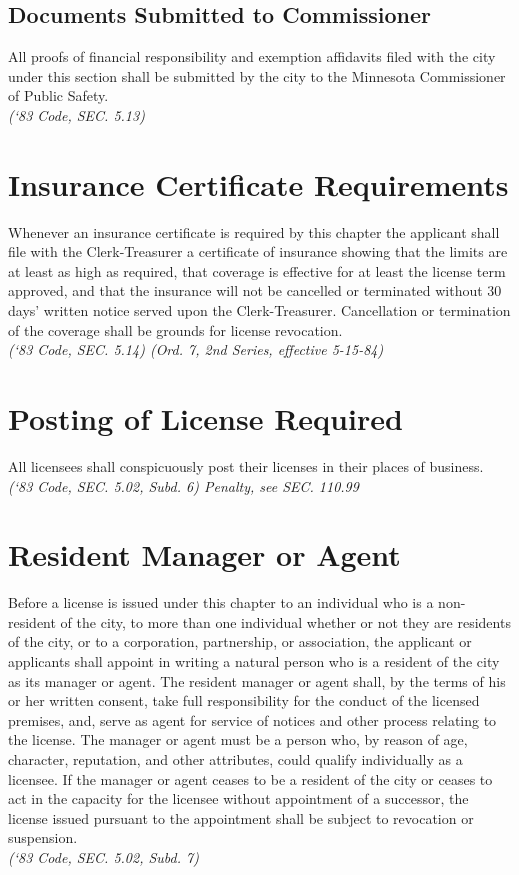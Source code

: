 \subsection{Documents Submitted to Commissioner}
All proofs of financial responsibility and exemption affidavits filed with the city under this section shall be submitted by the city to the Minnesota Commissioner of Public Safety.\\
\emph{(‘83 Code, SEC. 5.13)}
\section{Insurance Certificate Requirements}
Whenever an insurance certificate is required by this chapter the applicant shall file with the Clerk-Treasurer a certificate of insurance showing that the limits are at least as high as required, that coverage is effective for at least the license term approved, and that the insurance will not be cancelled or terminated without 30 days’ written notice served upon the Clerk-Treasurer.  Cancellation or termination of the coverage shall be grounds for license revocation.\\
\emph{(‘83 Code, SEC. 5.14)  (Ord. 7, 2nd Series, effective 5-15-84)}
\section{Posting of License Required}
All licensees shall conspicuously post their licenses in their places of business.\\
\emph{(‘83 Code, SEC. 5.02, Subd. 6)  Penalty, see SEC. 110.99}
\section{Resident Manager or Agent}
Before a license is issued under this chapter to an individual who is a non-resident of the city, to more than one individual whether or not they are residents of the city, or to a corporation, partnership, or association, the applicant or applicants shall appoint in writing a natural person who is a resident of the city as its manager or agent.  The resident manager or agent shall, by the terms of his or her written consent, take full responsibility for the conduct of the licensed premises, and, serve as agent for service of notices and other process relating to the license.  The manager or agent must be a person who, by reason of age, character, reputation, and other attributes, could qualify individually as a licensee.  If the manager or agent ceases to be a resident of the city or ceases to act in the capacity for the licensee without appointment of a successor, the license issued pursuant to the appointment shall be subject to revocation or suspension.\\
\emph{(‘83 Code, SEC. 5.02, Subd. 7)}

